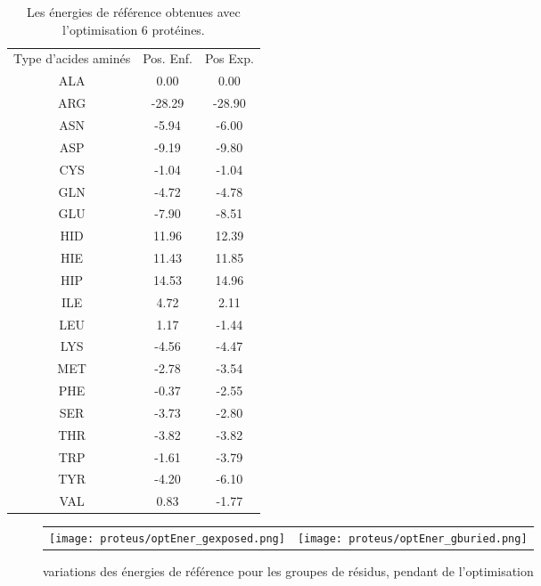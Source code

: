    \begin{table}[!htbp]
      \centering

      \begin{tabular}{ccc}

        \toprule
        Type d'acides aminés & Pos. Enf. & Pos Exp. \\
        \cmidrule{1-3}

        ALA & 0.00     &  0.00     \\
        ARG & -28.29   &  -28.90   \\
        ASN & -5.94    &  -6.00    \\
        ASP & -9.19    &  -9.80    \\
        CYS & -1.04    &  -1.04    \\
        GLN & -4.72    &  -4.78    \\
        GLU & -7.90    &  -8.51    \\
        HID & 11.96    &  12.39    \\
        HIE & 11.43    &  11.85    \\
        HIP & 14.53    &  14.96    \\
        ILE & 4.72     &  2.11     \\
        LEU & 1.17     &  -1.44    \\
        LYS & -4.56    &  -4.47    \\
        MET & -2.78    &  -3.54    \\
        PHE & -0.37    &  -2.55    \\
        SER & -3.73    &  -2.80    \\
        THR & -3.82    &  -3.82    \\
        TRP & -1.61    &  -3.79    \\
        TYR & -4.20    &  -6.10    \\
        VAL & 0.83     &  -1.77    \\

        \bottomrule


      \end{tabular}      
      \caption{Les énergies de référence obtenues avec l'optimisation 6 protéines.}
\label{tab:RefEner_groupes}      
    \end{table}

    \clearpage

   \begin{figure}[t]
     \centering
     \begin{tabular}{cc}
       \texttt{[image: proteus/optEner\_gexposed.png]} &
       \texttt{[image: proteus/optEner\_gburied.png]} \\
     \end{tabular}
     \caption{variations des énergies de référence pour les groupes de résidus, pendant de l'optimisation}
\label{graph:convEref}
   \end{figure}


